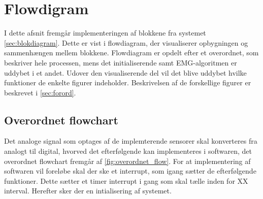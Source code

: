 \section{Flowdigram}
I dette afsnit fremgår implementeringen af blokkene fra systemet \autoref{sec:blokdiagram}. Dette er vist i flowdiagram, der visualiserer opbygningen og sammenhængen mellem blokkene. Flowdiagram er opdelt efter et overordnet, som beskriver hele processen, mens det initialiserende samt EMG-algoritmen er uddybet i et andet. Udover den visualiserende del vil det blive uddybet hvilke funktioner de enkelte figurer indeholder. Beskrivelsen af de forskellige figurer er beskrevet i \autoref{sec:forord}. 

\subsection{Overordnet flowchart}	
Det analoge signal som optages af de implemterende sensorer skal konverteres fra analogt til digital, hvorved det efterfølgende kan implementeres i softwaren, det overordnet flowchart fremgår af \autoref{fig:overordnet_flow}. For at implementering af softwaren vil foreløbe skal der ske et interrupt, som igang sætter de efterfølgende funktioner. Dette sætter et timer interrupt i gang som skal tælle inden for XX interval. Herefter sker der en intialisering af systemet.

